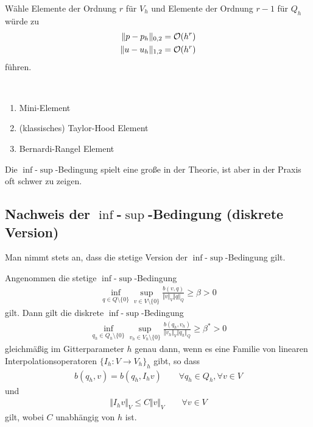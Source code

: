 Wähle Elemente der Ordnung $r$ für $V_h$ und Elemente der Ordnung $r-1$ für $Q_h$ würde zu
\begin{align*}
	\Vert p-p_h\Vert_{0,2}&=\mathcal{O}(h^r)\\
	\Vert u-u_h\Vert_{1,2}&=\mathcal{O}(h^r)
\end{align*}
führen.

\begin{beispiel}\
	\begin{enumerate}
		\item Mini-Element
		\item (klassisches) Taylor-Hood Element
		\item Bernardi-Rangel Element
	\end{enumerate}
\end{beispiel}

Die $\inf$-$\sup$-Bedingung spielt eine große in der Theorie, ist aber in der Praxis oft schwer zu zeigen.

\subsection{Nachweis der \texorpdfstring{$\inf$-$\sup$}{inf-sup}-Bedingung (diskrete Version)}
Man nimmt stets an, dass die stetige Version der $\inf$-$\sup$-Bedingung gilt.

\begin{lemma}[Fortin, 1977]\label{lemmaFortin}\enter
	Angenommen die stetige $\inf$-$\sup$-Bedingung
	\begin{align*}
		\inf_{q\in Q\setminus\{0\}}\sup_{v\in V\setminus\{0\}}\frac{b(v,q)}{\Vert v \Vert_V\Vert q\Vert_Q}\geq\beta>0
	\end{align*}
	gilt. Dann gilt die diskrete $\inf$-$\sup$-Bedingung
	\begin{align*}
		\inf_{q_h\in Q_h\setminus\{0\}}\sup_{v_h\in V_h\setminus\{0\}}\frac{b(q_h,v_h)}{\Vert v_h \Vert_V\Vert q_h\Vert_Q}\geq\beta^\ast>0
	\end{align*}
	gleichmäßig im Gitterparameter $h$ genau dann, wenn
	es eine Familie von linearen Interpolationsoperatoren $\{I_h\colon V\to V_h\}_h$ gibt, so dass
	\begin{align}\label{eqLemmaFortinBed1}
		b(q_h,v)=b(q_h,I_h v)\qquad\forall q_h\in Q_h,\forall v\in V
	\end{align}
	und
	\begin{align}\label{eqLemmaFortinBed2}
		\Vert I_h v\Vert_V\leq C\Vert v\Vert_V\qquad\forall v\in V
	\end{align}
	gilt, wobei $C$ unabhängig von $h$ ist.
\end{lemma}

